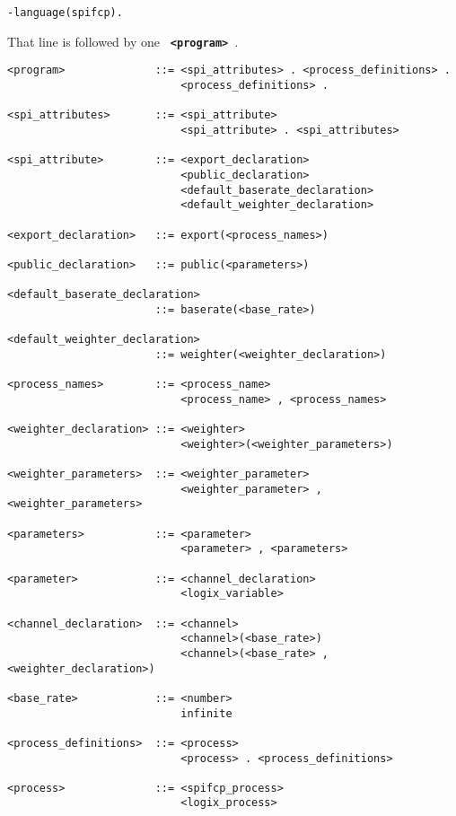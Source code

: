 \documentclass[twoside,10pt]{report}
\begin{document}
\begin{verbatim}
-language(spifcp).
\end{verbatim}

\noindent
That line is followed by one {\bf \verb+ <program> +}.

\begin{verbatim}
<program>              ::= <spi_attributes> . <process_definitions> .
                           <process_definitions> .

<spi_attributes>       ::= <spi_attribute>
                           <spi_attribute> . <spi_attributes>

<spi_attribute>        ::= <export_declaration>
                           <public_declaration>
                           <default_baserate_declaration>
                           <default_weighter_declaration>

<export_declaration>   ::= export(<process_names>)

<public_declaration>   ::= public(<parameters>)

<default_baserate_declaration>
                       ::= baserate(<base_rate>)

<default_weighter_declaration>
                       ::= weighter(<weighter_declaration>)

<process_names>        ::= <process_name>
                           <process_name> , <process_names>

<weighter_declaration> ::= <weighter>
                           <weighter>(<weighter_parameters>)

<weighter_parameters>  ::= <weighter_parameter>
                           <weighter_parameter> , <weighter_parameters>

<parameters>           ::= <parameter>
                           <parameter> , <parameters>

<parameter>            ::= <channel_declaration>
                           <logix_variable>

<channel_declaration>  ::= <channel>
                           <channel>(<base_rate>)
                           <channel>(<base_rate> , <weighter_declaration>)

<base_rate>            ::= <number>
                           infinite

<process_definitions>  ::= <process>
                           <process> . <process_definitions>

<process>              ::= <spifcp_process>
                           <logix_process>


\end{verbatim}
\end{document}
